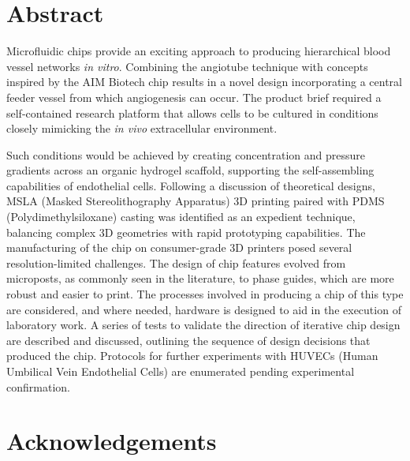 \documentclass[letterpaper,12pt]{article}
\begin{document}

\newpage

\newpage
\section*{Abstract}

Microfluidic chips provide an exciting approach to producing hierarchical blood vessel networks \textit{in vitro}. Combining the angiotube technique with concepts inspired by the AIM Biotech chip results in a novel design incorporating a central feeder vessel from which angiogenesis can occur. The product brief required a self-contained research platform that allows cells to be cultured in conditions closely mimicking the \textit{in vivo} extracellular environment.

Such conditions would be achieved by creating concentration and pressure gradients across an organic hydrogel scaffold, supporting the self-assembling capabilities of endothelial cells. Following a discussion of theoretical designs, MSLA (Masked Stereolithography Apparatus) 3D printing paired with PDMS (Polydimethylsiloxane) casting was identified as an expedient technique, balancing complex 3D geometries with rapid prototyping capabilities. The manufacturing of the chip on consumer-grade 3D printers posed several resolution-limited challenges. The design of chip features evolved from microposts, as commonly seen in the literature, to phase guides, which are more robust and easier to print. The processes involved in producing a chip of this type are considered, and where needed, hardware is designed to aid in the execution of laboratory work. A series of tests to validate the direction of iterative chip design are described and discussed, outlining the sequence of design decisions that produced the chip. Protocols for further experiments with HUVECs (Human Umbilical Vein Endothelial Cells) are enumerated pending experimental confirmation.
\newpage



\tableofcontents

\newpage
\section*{Acknowledgements}
\end{document}
